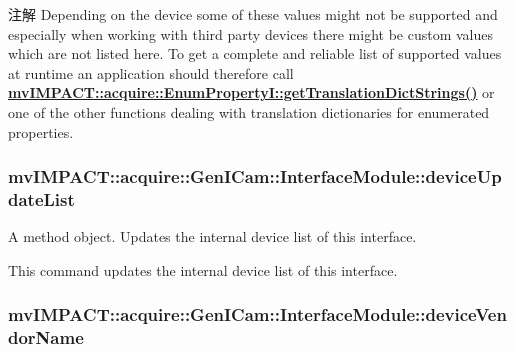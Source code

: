 \begin{DoxyNote}{注解}
Depending on the device some of these values might not be supported and especially when working with third party devices there might be custom values which are not listed here. To get a complete and reliable list of supported values at runtime an application should therefore call {\bfseries \hyperlink{classmv_i_m_p_a_c_t_1_1acquire_1_1_enum_property_i_a0ba6ccbf5ee69784d5d0b537924d26b6}{mv\+I\+M\+P\+A\+C\+T\+::acquire\+::\+Enum\+Property\+I\+::get\+Translation\+Dict\+Strings()}} or one of the other functions dealing with translation dictionaries for enumerated properties. 
\end{DoxyNote}
\hypertarget{classmv_i_m_p_a_c_t_1_1acquire_1_1_gen_i_cam_1_1_interface_module_ad53de9bcfcf03c9a702bfdca359ebe7c}{
\subsubsection[{device\+Update\+List}]{ mv\+I\+M\+P\+A\+C\+T\+::acquire\+::\+Gen\+I\+Cam\+::\+Interface\+Module\+::device\+Update\+List}}\label{classmv_i_m_p_a_c_t_1_1acquire_1_1_gen_i_cam_1_1_interface_module_ad53de9bcfcf03c9a702bfdca359ebe7c}


A method object. Updates the internal device list of this interface. 

This command updates the internal device list of this interface. \hypertarget{classmv_i_m_p_a_c_t_1_1acquire_1_1_gen_i_cam_1_1_interface_module_a4522d853c2dce100407c9e37ca70d75a}{
\subsubsection[{device\+Vendor\+Name}]{ mv\+I\+M\+P\+A\+C\+T\+::acquire\+::\+Gen\+I\+Cam\+::\+Interface\+Module\+::device\+Vendor\+Name}}\label{classmv_i_m_p_a_c_t_1_1acquire_1_1_gen_i_cam_1_1_interface_module_a4522d853c2dce100407c9e37ca70d75a}


